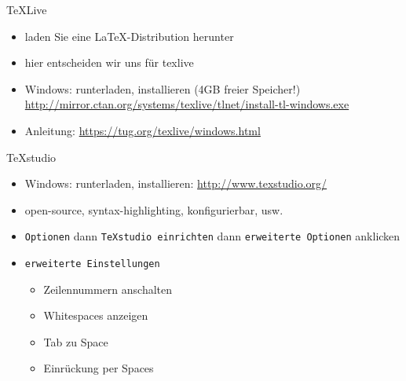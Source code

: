 \begin{frame}[fragile]{TeXLive}
    \begin{itemize}
        \itemsep1pt\parskip0pt
        \item laden Sie eine LaTeX-Distribution herunter
        \item hier entscheiden wir uns für texlive
        \item Windows: runterladen, installieren (4GB freier Speicher!) \url{http://mirror.ctan.org/systems/texlive/tlnet/install-tl-windows.exe}
        \item Anleitung: \url{https://tug.org/texlive/windows.html}
    \end{itemize}
\end{frame}

\begin{frame}[fragile]{TeXstudio}
    \begin{itemize}
        \item Windows: runterladen, installieren:
        \url{http://www.texstudio.org/}
        \item open-source, syntax-highlighting, konfigurierbar, usw.
        \item \texttt{Optionen} dann \texttt{TeXstudio einrichten} dann \texttt{erweiterte Optionen} anklicken
        \item \texttt{erweiterte Einstellungen}
        \begin{itemize}
            \item Zeilennummern anschalten
            \item Whitespaces anzeigen
            \item Tab zu Space
            \item Einrückung per Spaces
        \end{itemize}
    \end{itemize}
\end{frame}
